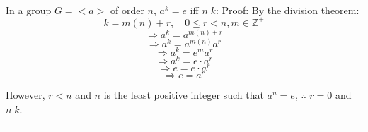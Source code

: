 \documentclass[11pt]{article}
\begin{document}
\begin{solution} \hfill \\
In a group $G=<a>$ of order $n$, $a^k=e$ iff $n|k$:
Proof:
By the division theorem:
$$k = m(n)+r, \quad 0\leq r<n, m\in \mathbb{Z}^+$$
$$\Rightarrow a^k = a^{m(n)+r}$$
$$\Rightarrow a^k = a^{m(n)}a^{r}$$
$$\Rightarrow a^k = e^{m}a^{r}$$
$$\Rightarrow a^k = e\cdot a^{r}$$
$$\Rightarrow e = e\cdot a^{r}$$
$$\Rightarrow e = a^{r}$$

However, $r<n$ and $n$ is the least positive integer such that $a^n=e$, $\therefore$ $r = 0$ and $n|k$.
\end{solution}
\vspace{6pt}
\hrule
\vspace{6pt}
\end{document}
